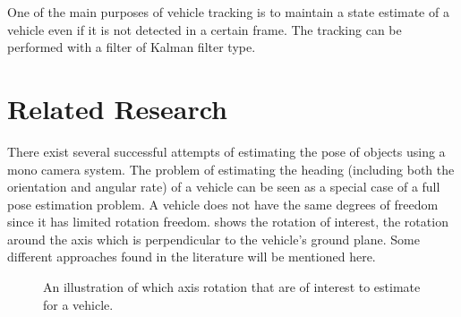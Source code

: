 One of the main purposes of vehicle tracking is to maintain a state estimate of a vehicle even if it is not detected in a certain frame.
The tracking can \eg be performed with a filter of Kalman filter \cite{Sivaraman:2013} type.

\section{Related Research}
\label{sec:relatedresearch}
There exist several successful attempts of estimating the  pose of objects using a mono camera system.
The problem of estimating the heading (including both the orientation and angular rate) of a vehicle can be seen as a special case of a full  pose estimation problem.
A vehicle does not have the same degrees of freedom since it has limited rotation freedom.
 shows the rotation of interest, \ie the rotation around the axis which is perpendicular to the vehicle's ground plane.
Some different approaches found in the literature will be mentioned here.

\begin{figure}[!ht]
	\centering
	\caption{\label{fig:vehiclerotation} An illustration of which axis rotation that are of interest to estimate for a vehicle.}
\end{figure}

